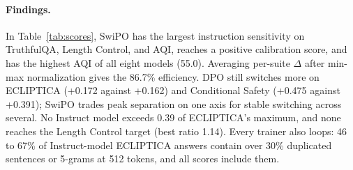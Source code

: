 \documentclass[letterpaper]{article} %
\begin{document}
\paragraph{Findings.}
In Table~\ref{tab:scores}, SwiPO has the largest instruction sensitivity on TruthfulQA, Length Control, and AQI, reaches a positive calibration score, and has the highest AQI of all eight models (55.0). Averaging per-suite $\Delta$ after min-max normalization gives the 86.7\% efficiency. DPO still switches more on ECLIPTICA (+0.172 against +0.162) and Conditional Safety (+0.475 against +0.391); SwiPO trades peak separation on one axis for stable switching across several. No Instruct model exceeds 0.39 of ECLIPTICA's maximum, and none reaches the Length Control target (best ratio 1.14). Every trainer also loops: 46 to 67\% of Instruct-model ECLIPTICA answers contain over 30\% duplicated sentences or 5-grams at 512 tokens, and all scores include them.

{\small

}
\end{document}
